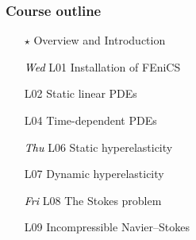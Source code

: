 \documentclass{fenicscourse}
\begin{document}

\begin{frame}
  \frametitle{Course outline}



  \begin{enumerate}
  \item[$\star$]
    Overview and Introduction
  \item[\textcolor{black}{\it Wed} L01]
    Installation of FEniCS
  \item[L02]
    Static linear PDEs
  \item[L04]
    Time-dependent PDEs
    \bigskip
  \item[\textcolor{black}{\it Thu} L06]
    Static hyperelasticity
  \item[L07]
    Dynamic hyperelasticity
    \bigskip
  \item[\textcolor{black}{\it Fri} L08]
    The Stokes problem
  \item[L09]
    Incompressible Navier--Stokes
  \end{enumerate}

  \normalsize

\end{frame}
\end{document}
